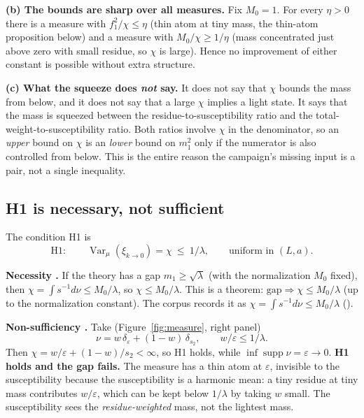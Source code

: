 \textbf{(b) The bounds are sharp over all measures.} Fix $M_0=1$. For every $\eta>0$ there is a
measure with $f_1^2/\chi\le\eta$ (thin atom at tiny mass, the thin-atom proposition below) and a
measure with $M_0/\chi\ge1/\eta$ (mass concentrated just above zero with small residue, so
$\chi$ is large). Hence no improvement of either constant is possible without extra structure.

\textbf{(c) What the squeeze does \emph{not} say.} It does not say that $\chi$ bounds the mass
from below, and it does not say that a large $\chi$ implies a light state. It says that the mass
is squeezed between the residue-to-susceptibility ratio and the total-weight-to-susceptibility
ratio. Both ratios involve $\chi$ in the denominator, so an \emph{upper} bound on $\chi$ is an
\emph{lower} bound on $m_1^2$ only if the numerator is also controlled from below. This is the
entire reason the campaign's missing input is a pair, not a single inequality.

\subsection{H1 is necessary, not sufficient}
\label{sec:h1-notsuff}

The condition H1 is
\begin{equation}
\mathrm{H1}:\qquad \operatorname{Var}_\mu(\xi_{k\to0})=\chi\ \le\ 1/\lambda,
\qquad\text{uniform in }(L,a).
\label{eq:h1}
\end{equation}

\textbf{Necessity \LT.} If the theory has a gap $m_1\ge\sqrt\lambda$ (with the normalization
$M_0$ fixed), then $\chi=\int s^{-1}d\nu\le M_0/\lambda$, so $\chi\le M_0/\lambda$. This is a
theorem: $\text{gap}\Rightarrow\chi\le M_0/\lambda$ (up to the normalization constant). The
corpus records it as $\chi=\int s^{-1}d\nu\le M_0/\lambda$ ().

\textbf{Non-sufficiency \LT.} Take (Figure~\ref{fig:measure}, right panel)
\begin{equation}
\nu=w\,\delta_\varepsilon+(1-w)\,\delta_{s_2},\qquad w/\varepsilon\le1/\lambda .
\label{eq:thinatom}
\end{equation}
Then $\chi=w/\varepsilon+(1-w)/s_2<\infty$, so H1 holds, while
$\inf\operatorname{supp}\nu=\varepsilon\to0$. \textbf{H1 holds and the gap fails.} The measure has
a thin atom at $\varepsilon$, invisible to the susceptibility because the susceptibility is a
harmonic mean: a tiny residue at tiny mass contributes $w/\varepsilon$, which can be kept below
$1/\lambda$ by taking $w$ small. The susceptibility sees the \emph{residue-weighted} mass, not the
lightest mass.

